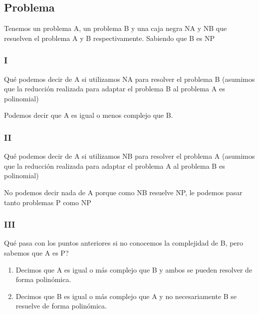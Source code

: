 
\subsection{Problema}
Tenemos un problema A, un problema B y una caja negra NA y NB que resuelven el problema A y B respectivamente. Sabiendo que B es NP
\subsubsection{I}
Qué podemos decir de A si utilizamos NA para resolver el problema B (asumimos que la reducción realizada para adaptar el problema B al problema A es polinomial)\newline

Podemos decir que A es igual o menos complejo que B.
\subsubsection{II}
Qué podemos decir de A si utilizamos NB para resolver el problema A (asumimos que la reducción realizada para adaptar el problema A al problema B es polinomial)\newline

No podemos decir nada de A porque como NB resuelve NP, le podemos pasar tanto problemas P como NP

\subsubsection{III}
Qué pasa con los puntos anteriores si no conocemos la complejidad de B, pero sabemos que A es P?

\begin{enumerate}
    \item Decimos que A es igual o más complejo que B y ambos se pueden resolver de forma polinómica.
    \item Decimos que B es igual o más complejo que A y no necesariamente B se resuelve de forma polinómica.
\end{enumerate}

